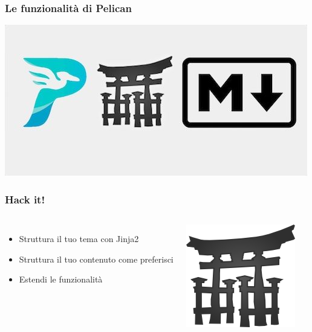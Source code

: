 \begin{frame}
	\frametitle{Le funzionalità di Pelican}
	\begin{center}
		\includegraphics[scale=0.5]{img/pelican_stuff}
	\end{center}
\end{frame}

\begin{frame}
	\frametitle{Hack it!}
	\begin{columns}
		\begin{itemize}
			\item<1-> Struttura il tuo tema con Jinja2
			\item<2-> Struttura il tuo contenuto come preferisci
			\item<3-> Estendi le funzionalità
		\end{itemize}
		\begin{center}
			\includegraphics[scale=1]{img/jinja.png}
		\end{center}
	\end{columns}

\end{frame}

